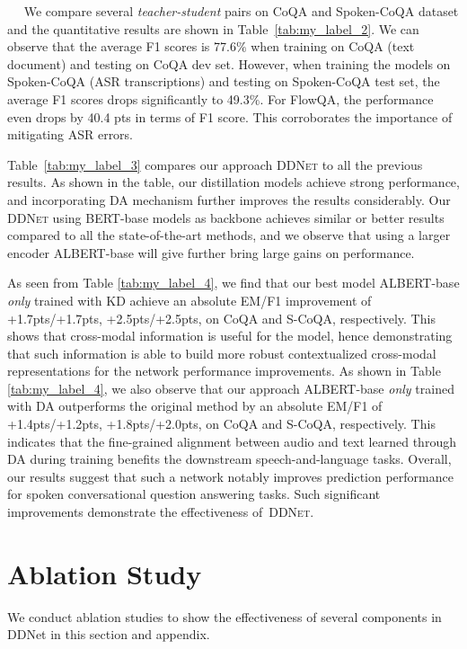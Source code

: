 \documentclass[11pt]{article}
\newcommand{\myparagraph}[1]{\vspace{2pt}\noindent{\bf{#1}}~~}
\begin{document}
\myparagraph{Results.}
We compare several \textit{teacher-student} pairs on CoQA and Spoken-CoQA dataset and the quantitative results are shown in Table~\ref{tab:my_label_2}. We can observe that the average F1 scores is 77.6$\%$ when training on CoQA (text document) and testing on CoQA dev set. However, when training the models on Spoken-CoQA (ASR transcriptions) and testing on Spoken-CoQA test set, the average F1 scores drops significantly to 49.3$\%$. For FlowQA, the performance even drops by 40.4 pts in terms of F1 score. This corroborates the importance of mitigating ASR errors.

Table~\ref{tab:my_label_3} compares our approach \textsc{DDNet} to all the previous results. As shown in the table, our distillation models achieve strong performance, and incorporating DA mechanism further improves the results considerably. Our \textsc{DDNet} using BERT-base models as backbone achieves similar or better results compared to all the state-of-the-art methods, and we observe that using a larger encoder ALBERT-base will give further bring large gains on performance.


As seen from Table \ref{tab:my_label_4}, we find that our best model ALBERT-base \textit{only} trained with KD achieve an absolute EM/F1 improvement of +1.7pts/+1.7pts, +2.5pts/+2.5pts, on CoQA and S-CoQA, respectively.
 This shows that cross-modal information is useful for the model, hence demonstrating that such information is able to build more robust contextualized cross-modal representations for the network performance improvements.
As shown in Table \ref{tab:my_label_4}, we also observe that our approach ALBERT-base \textit{only} trained with DA outperforms the original method by an absolute EM/F1 of +1.4pts/+1.2pts, +1.8pts/+2.0pts, on CoQA and S-CoQA, respectively.
This indicates that the fine-grained alignment between audio and text learned through DA during training benefits the downstream speech-and-language tasks.
Overall, our results suggest that such a network notably improves prediction performance for spoken conversational question answering tasks. Such significant improvements demonstrate the effectiveness of~\textsc{DDNet}.
 
\section{Ablation Study}
We conduct ablation studies to show the effectiveness of several components
in DDNet in this section and appendix.
\end{document}
